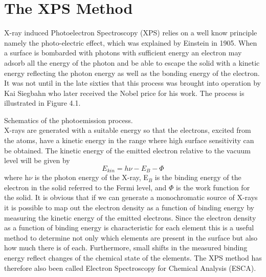 \newpage
\chapter{The XPS Method}

          X-ray induced Photoelectron Spectroscopy (XPS) relies on a
          well know principle namely the photo-electric effect, which
          was explained by Einstein in 1905. When a surface is bombarded
          with photons with sufficient energy an electron may adsorb
          all the energy of the photon and be able to escape the solid
          with a kinetic energy reflecting the photon energy as well
          as the bonding energy of the electron. It was not until in
          the late sixties that this process was brought into
          operation by Kai Siegbahn who later received the Nobel price
          for his work. The process is illustrated in Figure 4.1.
          \vspace*{9.5cm}

             Schematics of the photoemission
        process.\\

           X-rays are generated with a suitable  energy
          so that the electrons, excited from the atoms,
          have a kinetic  energy  in  the  range  where  high  surface
          sensitivity can be  obtained.  The  kinetic  energy  of  the
          emitted electron relative to the vacuum level will be  given
          by \begin{equation}  E_{kin}=h\nu-E_{B}-\Phi  \end{equation}
          where h$\nu$ is the photon energy of the X-ray,  E$_{B}$  is
          the binding energy of the electron in the solid referred  to
          the Fermi level, and $\Phi$ is the  work  function  for  the
          solid. It is obvious that if we can generate a monochromatic
          source of X-rays it is possible  to  map  out  the  electron
          density as a function of binding  energy  by  measuring  the
          kinetic energy of the emitted electrons. Since the  electron
          density as a function of binding  energy  is  characteristic
          for each element this is a useful method  to  determine  not
          only which elements are present in the surface but also  how
          much there is  of each. Furthermore,  small  shifts  in  the
          measured binding energy  reflect  changes  of  the  chemical
          state of the elements. The XPS  method  has  therefore  also
          been called  Electron  Spectroscopy  for  Chemical  Analysis
          (ESCA).


